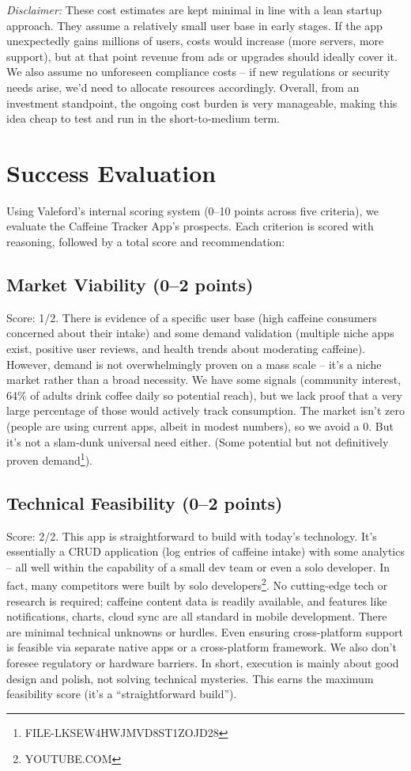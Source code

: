 \documentclass{article}
\begin{document}
\textit{Disclaimer:} These cost estimates are kept minimal in line with a lean startup approach. They assume a relatively small user base in early stages. If the app unexpectedly gains millions of users, costs would increase (more servers, more support), but at that point revenue from ads or upgrades should ideally cover it. We also assume no unforeseen compliance costs – if new regulations or security needs arise, we’d need to allocate resources accordingly. Overall, from an investment standpoint, the ongoing cost burden is very manageable, making this idea cheap to test and run in the short-to-medium term.

\section{Success Evaluation}
Using Valeford’s internal scoring system (0–10 points across five criteria), we evaluate the Caffeine Tracker App’s prospects. Each criterion is scored with reasoning, followed by a total score and recommendation:

\subsection{Market Viability (0–2 points)}
Score: 1/2. There is evidence of a specific user base (high caffeine consumers concerned about their intake) and some demand validation (multiple niche apps exist, positive user reviews, and health trends about moderating caffeine). However, demand is not overwhelmingly proven on a mass scale – it’s a niche market rather than a broad necessity. We have some signals (community interest, 64\% of adults drink coffee daily so potential reach\footnotemark[1]), but we lack proof that a very large percentage of those would actively track consumption. The market isn’t zero (people are using current apps, albeit in modest numbers), so we avoid a 0. But it’s not a slam-dunk universal need either. (Some potential but not definitively proven demand\footnote{FILE-LKSEW4HWJMVD8ST1ZOJD28}).

\subsection{Technical Feasibility (0–2 points)}
Score: 2/2. This app is straightforward to build with today’s technology. It’s essentially a CRUD application (log entries of caffeine intake) with some analytics – all well within the capability of a small dev team or even a solo developer. In fact, many competitors were built by solo developers\footnote{YOUTUBE.COM}. No cutting-edge tech or research is required; caffeine content data is readily available, and features like notifications, charts, cloud sync are all standard in mobile development. There are minimal technical unknowns or hurdles. Even ensuring cross-platform support is feasible via separate native apps or a cross-platform framework. We also don’t foresee regulatory or hardware barriers. In short, execution is mainly about good design and polish, not solving technical mysteries. This earns the maximum feasibility score (it’s a “straightforward build”\footnotemark[9]).
\end{document}
